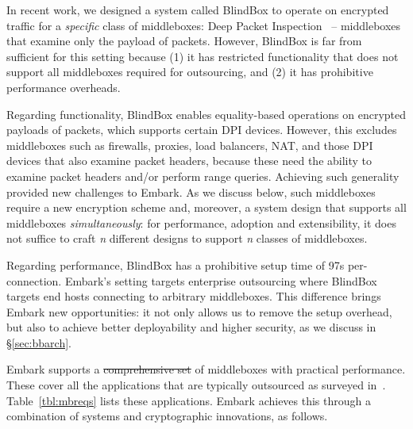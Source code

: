 \documentclass[letterpaper,twocolumn,10pt]{article}
\newcommand{\sys}{Embark\xspace} %
\providecommand{\DIFaddtex}[1]{{\protect\color{blue}\uwave{#1}}} %
\providecommand{\DIFdeltex}[1]{{\protect\color{red}\sout{#1}}}                      %
\providecommand{\DIFaddbegin}{} %
\providecommand{\DIFaddend}{} %
\providecommand{\DIFdelbegin}{} %
\providecommand{\DIFdelend}{} %
\providecommand{\DIFadd}[1]{\texorpdfstring{\DIFaddtex{#1}}{#1}} %
\providecommand{\DIFdel}[1]{\texorpdfstring{\DIFdeltex{#1}}{}} %
\begin{document}
In recent work, we designed a system called BlindBox to operate on encrypted traffic for a {\em specific} class of middleboxes: Deep Packet Inspection~\cite{blindbox} -- middleboxes that examine only the payload of packets. 
However, BlindBox is far from sufficient for this setting because
 (1) it has restricted functionality that does not support all middleboxes required for outsourcing, and (2) it has prohibitive performance overheads.

 Regarding functionality, BlindBox enables equality-based operations on  encrypted payloads of packets, which supports certain DPI devices. However, this excludes middleboxes such as firewalls, proxies, load balancers, NAT,  and those DPI devices that also examine packet headers, because these need the ability to examine packet headers and/or perform range queries. 
 Achieving such generality provided new challenges to \sys. 
As we discuss below, such middleboxes require a new encryption scheme and, moreover, a system design that supports all middleboxes {\it simultaneously}: for performance, adoption and extensibility, it does not suffice to craft {\it n} different designs to support {\it n} classes of middleboxes. 

 
Regarding performance, BlindBox has a prohibitive setup time of 97s per-connection. 
\sys's setting targets enterprise outsourcing where BlindBox targets end hosts connecting to arbitrary middleboxes. This difference brings \sys new opportunities: it
not only allows us to remove the setup overhead, but also to achieve better deployability and higher security, as we discuss in \S\ref{sec:bbarch}. 

\sys supports a \DIFdelbegin \DIFdel{comprehensive set }\DIFdelend \DIFaddbegin \DIFadd{wide range }\DIFaddend of middleboxes with practical performance. These cover all the applications that are typically outsourced as surveyed in~\cite{aplomb}. Table~\ref{tbl:mbreqs} lists these applications. 
\sys achieves this through a combination of systems and cryptographic innovations, as follows.
\end{document}
